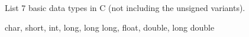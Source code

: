 List 7 basic data types in C (not including the unsigned variants).

\begin{answer}
char, short, int, long, long long, float, double, long double
\end{answer}
